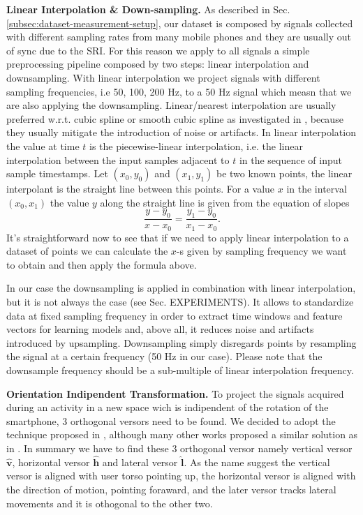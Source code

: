 \vspace{1em}
\textbf{Linear Interpolation \& Down-sampling.} As described in
Sec. \ref{subsec:dataset-measurement-setup}, our dataset is composed
by signals collected with different sampling rates from many mobile
phones and they are usually out of sync due to the SRI. For this
reason we apply to all signals a simple preprocessing pipeline
composed by two steps: linear interpolation and downsampling. With
linear interpolation we project signals with different sampling
frequencies, i.e 50, 100, 200 Hz, to a 50 Hz signal which measn that
we are also applying the downsampling.  Linear/nearest interpolation
are usually preferred w.r.t. cubic spline or smooth cubic spline as
investigated in \cite{stisen2015smart}, because they usually mitigate
the introduction of noise or artifacts. In linear interpolation the
value at time $t$ is the piecewise-linear interpolation, i.e. the
linear interpolation between the input samples adjacent to $t$ in the
sequence of input sample timestamps. Let $(x_0, y_0)$ and $(x_1, y_1)$
be two known points, the linear interpolant is the straight line
between this points. For a value $x$ in the interval $(x_0, x_1)$ the
value $y$ along the straight line is given from the equation of slopes
\begin{equation}
  \label{eq:linear-interpolation}
  \frac{y - y_0}{x - x_0} = \frac{y_1 - y_0}{x_1 - x_0}.
\end{equation}
It's straightforward now to see that if we need to apply linear
interpolation to a dataset of points we can calculate the \mbox{$x$-s}
given by sampling frequency we want to obtain and then apply the
formula above.

In our case the downsampling is applied in combination with linear
interpolation, but it is not always the case (see
Sec. EXPERIMENTS). It allows to standardize data at fixed sampling
frequency in order to extract time windows and feature vectors for
learning models and, above all, it reduces noise and artifacts
introduced by upsampling. Downsampling simply disregards points by
resampling the signal at a certain frequency (50 Hz in our
case). Please note that the downsample frequency should be a
sub-multiple of linear interpolation frequency.

\vspace{1em}
\textbf{Orientation Indipendent Transformation.}
To project the signals acquired during an activity in a new space wich is indipendent of the rotation of the smartphone, 3 orthogonal versors need to be found. We decided to adopt the technique proposed in \cite{gadaleta2018idnet}, although many other works proposed a similar solution as in \cite{kunze2009way, henpraserttae2011accurate}. In summary we have to find these 3 orthogonal versor namely vertical versor $\boldsymbol{\hat{v}}$, horizontal versor $\boldsymbol{\hat{h}}$ and lateral versor $\boldsymbol{\hat{l}}$. As the name suggest the vertical versor is aligned with user torso pointing up, the horizontal versor is aligned with the direction of motion, pointing foraward, and the later versor tracks lateral movements and it is othogonal to the other two.

